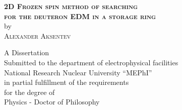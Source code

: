 \begin{titlepage}

\begin{center}

\textsc{\textbf{ 2D Frozen spin method of searching  \\
	for the deuteron EDM in a storage ring  }}\\[2cm]

by \\[2cm]

% 
\textsc{ Alexander Aksentev \\[2.4cm] }

A Dissertation \\
Submitted to the department of electrophysical facilities \\
National Research Nuclear University ``MEPhI''\\
in partial fulfillment of the requirements\\
for the degree of\\[1cm]
Physics - Doctor of Philosophy


\end{center}




\vfill


\begin{center}
\the\year{}
\end{center}



\end{titlepage}
